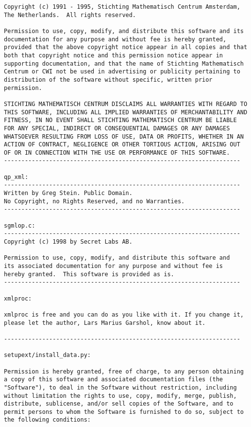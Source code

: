 \begin{verbatim}
Copyright (c) 1991 - 1995, Stichting Mathematisch Centrum Amsterdam,
The Netherlands.  All rights reserved.

Permission to use, copy, modify, and distribute this software and its
documentation for any purpose and without fee is hereby granted,
provided that the above copyright notice appear in all copies and that
both that copyright notice and this permission notice appear in
supporting documentation, and that the name of Stichting Mathematisch
Centrum or CWI not be used in advertising or publicity pertaining to
distribution of the software without specific, written prior
permission.

STICHTING MATHEMATISCH CENTRUM DISCLAIMS ALL WARRANTIES WITH REGARD TO
THIS SOFTWARE, INCLUDING ALL IMPLIED WARRANTIES OF MERCHANTABILITY AND
FITNESS, IN NO EVENT SHALL STICHTING MATHEMATISCH CENTRUM BE LIABLE
FOR ANY SPECIAL, INDIRECT OR CONSEQUENTIAL DAMAGES OR ANY DAMAGES
WHATSOEVER RESULTING FROM LOSS OF USE, DATA OR PROFITS, WHETHER IN AN
ACTION OF CONTRACT, NEGLIGENCE OR OTHER TORTIOUS ACTION, ARISING OUT
OF OR IN CONNECTION WITH THE USE OR PERFORMANCE OF THIS SOFTWARE.
--------------------------------------------------------------------

qp_xml:
--------------------------------------------------------------------
Written by Greg Stein. Public Domain.
No Copyright, no Rights Reserved, and no Warranties.
--------------------------------------------------------------------

sgmlop.c:
--------------------------------------------------------------------
Copyright (c) 1998 by Secret Labs AB.

Permission to use, copy, modify, and distribute this software and
its associated documentation for any purpose and without fee is
hereby granted.  This software is provided as is.
--------------------------------------------------------------------

xmlproc:

xmlproc is free and you can do as you like with it. If you change it,
please let the author, Lars Marius Garshol, know about it.

--------------------------------------------------------------------

setupext/install_data.py:

Permission is hereby granted, free of charge, to any person obtaining
a copy of this software and associated documentation files (the
"Software"), to deal in the Software without restriction, including
without limitation the rights to use, copy, modify, merge, publish,
distribute, sublicense, and/or sell copies of the Software, and to
permit persons to whom the Software is furnished to do so, subject to
the following conditions:
 

\end{verbatim}
